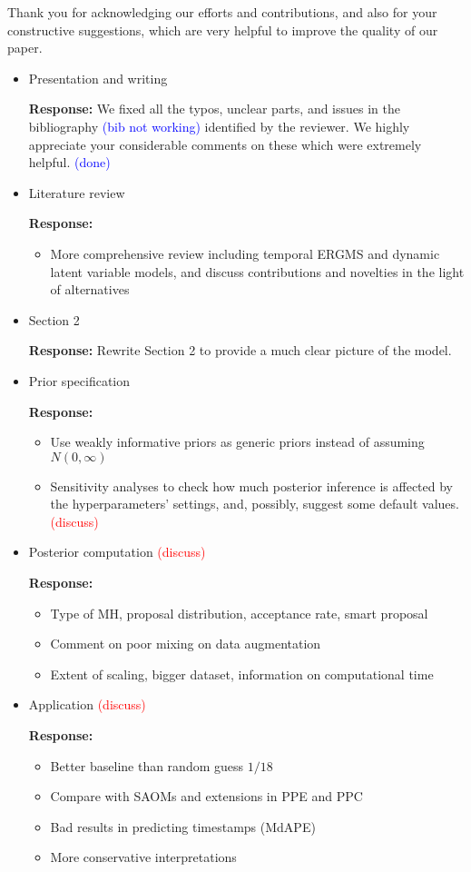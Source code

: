 \documentclass[12pt]{article}
\theoremstyle{definition}
\begin{document}
Thank you for acknowledging our efforts and contributions, and also for your constructive suggestions, which are very helpful to improve the quality of our paper.
\begin{itemize}
	\item Presentation and writing
	
	\textbf{  Response:} We fixed all the typos, unclear parts, and issues in the bibliography \textcolor{blue}{(bib not working)} identified by the reviewer. We highly appreciate your considerable comments on these which were extremely helpful. \textcolor{blue}{(done)}

  \item Literature review

\textbf{  Response:} 
\begin{itemize}
	\item More comprehensive review including temporal ERGMS and dynamic latent variable models, and discuss contributions and novelties in the light of alternatives
\end{itemize}

\item Section 2

\textbf{  Response:} Rewrite Section 2 to provide a much clear picture of the model.


\item Prior specification

\textbf{  Response:} 
\begin{itemize}
	\item Use weakly informative priors as generic priors instead of assuming $N(0, \infty)$
	\item Sensitivity analyses to check how much posterior inference is affected by the hyperparameters' settings, and, possibly, suggest some default values.  \textcolor{red}{(discuss)} 
\end{itemize}

\item Posterior computation  \textcolor{red}{(discuss)} 

\textbf{  Response:} 
\begin{itemize}
	\item Type of MH, proposal distribution, acceptance rate, smart proposal
	\item Comment on poor mixing on data augmentation
	\item Extent of scaling, bigger dataset, information on computational time
\end{itemize}
\item Application  \textcolor{red}{(discuss)} 

\textbf{  Response:} 
\begin{itemize}
	\item Better baseline than random guess $1/18$ 
	\item Compare with SAOMs and extensions in PPE and PPC 
	\item Bad results in predicting timestamps (MdAPE)
	\item More conservative interpretations 
\end{itemize}
\end{itemize}
\end{document}
